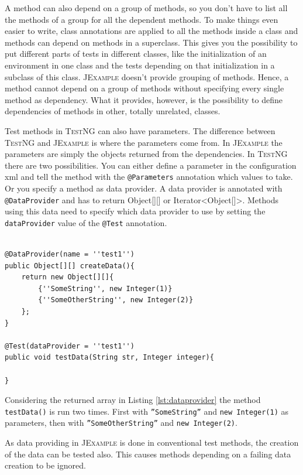 \documentclass[11pt,a4paper,pdftex]{article}
\makeatletter
\newcommand{\JExample}{\textsc{JExample}\xspace}
\newcommand{\TestNG}{\textsc{TestNG}\xspace}
\newcommand{\ttt}[1]{\texttt{#1}}
\newcommand{\attest}{\ttt{@Test}\xspace}
\makeatother
\begin{document}
A method can also depend on a group of methods, so you don't have to list all the methods of a group for all the dependent methods. To make things even easier to write, class annotations are applied to all the methods inside a class and methods can depend on methods in a superclass. This gives you the possibility to put different parts of tests in different classes, like the initialization of an environment in one class and the tests depending on that initialization in a subclass of this class. \JExample doesn't provide grouping of methods. Hence, a method cannot depend on a group of methods without specifying every single method as dependency. What it provides, however, is the possibility to define dependencies of methods in other, totally unrelated, classes.

Test methods in \TestNG can also have parameters. The difference between \TestNG and \JExample is where the parameters come from. In \JExample the parameters are simply the objects returned from the dependencies. In \TestNG there are two possibilities. You can either define a parameter in the configuration xml and tell the method with the \ttt{@Parameters} annotation which values to take. Or you specify a method as data provider. A data provider is annotated with \ttt{@DataProvider} and has to return Object[][] or Iterator<Object[]>. Methods using this data need to specify which data provider to use by setting the \ttt{dataProvider} value of the \attest annotation.

\begin{lstlisting}[label=lst:dataprovider,caption=Data providing in \TestNG with \ttt{@DataProvider}.]

@DataProvider(name = ''test1'')
public Object[][] createData(){
	return new Object[][]{
		{''SomeString'', new Integer(1)}
		{''SomeOtherString'', new Integer(2)}
	};
}

@Test(dataProvider = ''test1'')
public void testData(String str, Integer integer){

}

\end{lstlisting}

Considering the returned array in Listing \ref{lst:dataprovider} the method \ttt{testData()} is run two times. First with \ttt{''SomeString''} and \ttt{new Integer(1)} as parameters, then with \ttt{''SomeOtherString''} and \ttt{new Integer(2)}.

As data providing in \JExample is done in conventional test methods, the creation of the data can be tested also. This causes methods depending on a failing data creation to be ignored.\\
\end{document}
